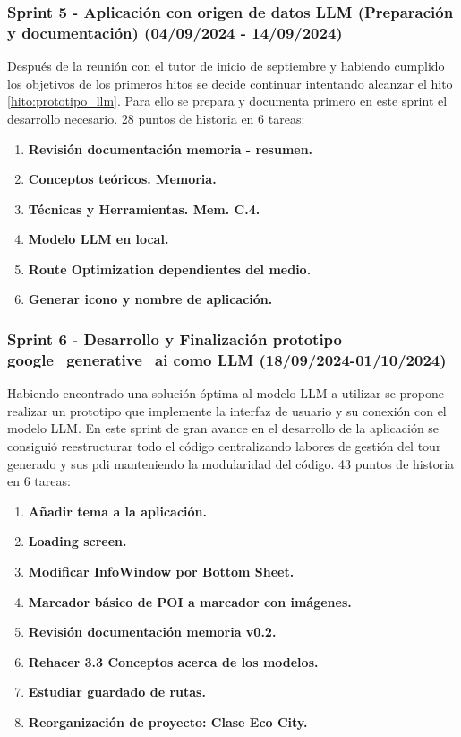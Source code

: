 \subsubsection{Sprint 5 - Aplicación con origen de datos LLM (Preparación y documentación) (04/09/2024 - 14/09/2024)} 
Después de la reunión con el tutor de inicio de septiembre y habiendo cumplido los objetivos de los primeros hitos se decide continuar intentando alcanzar el hito \ref{hito:prototipo_llm}. Para ello se prepara y documenta primero en este sprint el desarrollo necesario. 28 puntos de historia en 6 tareas:
\begin{enumerate}
	\item \textbf{Revisión documentación memoria - resumen.}
	\item \textbf{Conceptos teóricos. Memoria.}
	\item \textbf{Técnicas y Herramientas. Mem. C.4.}
	\item \textbf{Modelo LLM en local.}
	\item \textbf{Route Optimization dependientes del medio.}
	\item \textbf{Generar icono y nombre de aplicación.}
\end{enumerate}

\subsubsection{Sprint 6 - Desarrollo y Finalización prototipo google\_generative\_ai como LLM (18/09/2024-01/10/2024)}
Habiendo encontrado una solución óptima al modelo LLM a utilizar se propone realizar un prototipo que implemente la interfaz de usuario y su conexión con el modelo LLM. En este sprint de gran avance en el desarrollo de la aplicación se consiguió reestructurar todo el código centralizando labores de gestión del tour generado y sus \acrshort{pdi} manteniendo la modularidad del código. 43 puntos de historia en 6 tareas:
\begin{enumerate}
	\item \textbf{Añadir tema a la aplicación.}
	\item \textbf{Loading screen.}
	\item \textbf{Modificar InfoWindow por Bottom Sheet.}
	\item \textbf{Marcador básico de POI a marcador con imágenes.}
	\item \textbf{Revisión documentación memoria v0.2.}
	\item \textbf{Rehacer 3.3 Conceptos acerca de los modelos.}
	\item \textbf{Estudiar guardado de rutas.}
	\item \textbf{Reorganización de proyecto: Clase Eco City.}
\end{enumerate}
	
